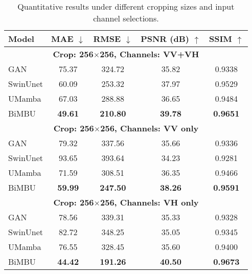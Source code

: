 \begin{table}
    \centering
    \renewcommand{\arraystretch}{1.2} %
    \caption{Quantitative results under different cropping sizes and input channel selections.}
    \label{tab:experiment_results}
    \begin{tabular}{lcccc}
    \hline
    \textbf{Model} & \textbf{MAE} $\downarrow$ & \textbf{RMSE} $\downarrow$ & \textbf{PSNR (dB)} $\uparrow$ & \textbf{SSIM} $\uparrow$ \\
    \hline
    
    \multicolumn{5}{c}{\textbf{Crop: 256$\times$256, Channels: VV+VH}} \\
    GAN      & 75.37 & 324.72 & 35.82 & 0.9338 \\
    SwinUnet & 60.09 & 253.32 & 37.97 & 0.9529 \\
    UMamba   & 67.03 & 288.88 & 36.65 & 0.9484 \\
    BiMBU    & \textbf{49.61} & \textbf{210.80} & \textbf{39.78} & \textbf{0.9651} \\
    \hline
    \multicolumn{5}{c}{\textbf{Crop: 256$\times$256, Channels: VV only}} \\
    GAN      & 79.32 & 337.56 & 35.66 & 0.9336 \\
    SwinUnet & 93.65 & 393.64 & 34.23 & 0.9281 \\
    UMamba   & 71.59 & 308.51 & 36.35 & 0.9466 \\
    BiMBU    & \textbf{59.99} & \textbf{247.50} & \textbf{38.26} & \textbf{0.9591} \\
    \hline
    \multicolumn{5}{c}{\textbf{Crop: 256$\times$256, Channels: VH only}} \\
    GAN      & 78.56 & 339.31 & 35.33 & 0.9328 \\
    SwinUnet & 82.72 & 348.25 & 35.05 & 0.9345 \\
    UMamba   & 76.55 & 328.45 & 35.60 & 0.9400 \\
    BiMBU    & \textbf{44.42} & \textbf{191.26} & \textbf{40.50} & \textbf{0.9673} \\
    \hline
    

\end{tabular}
\end{table}
